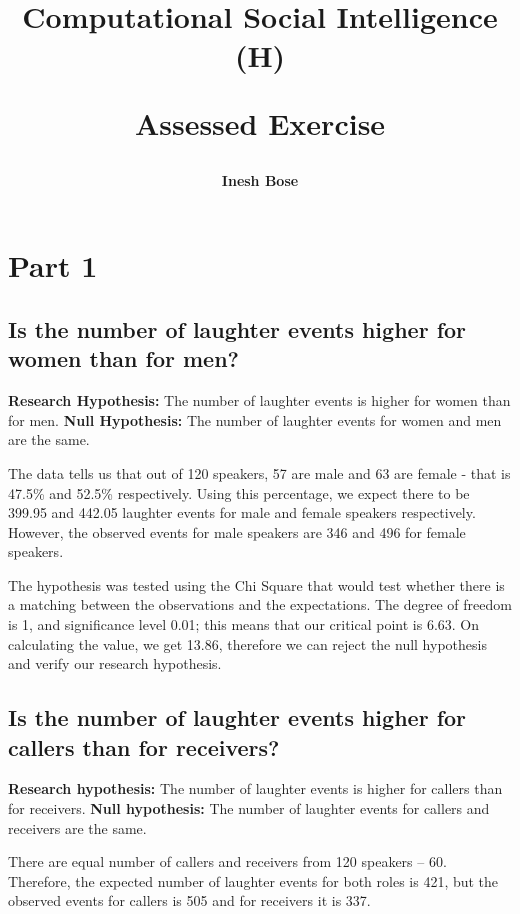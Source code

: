\documentclass[12pt,a4paper]{article}
\title{%
    {\Large Computational Social Intelligence (H) \par}
    {\Huge Assessed Exercise \par}
}
\author{\bf Inesh Bose}
\date{}
\begin{document}

\maketitle




\section*{Part 1}

\subsection*{Is the number of laughter events higher for women than for men?}

\textbf{Research Hypothesis:} The number of laughter events is higher for women than for men.\newline
\textbf{Null Hypothesis:} The number of laughter events for women and men are the same.

The data tells us that out of 120 speakers, 57 are male and 63 are female - that is 47.5\% and 52.5\% respectively. Using this percentage, we expect there to be 399.95 and 442.05 laughter events for male and female speakers respectively. However, the observed events for male speakers are 346 and 496 for female speakers.

The hypothesis was tested using the Chi Square that would test whether there is a matching between the observations and the expectations. The degree of freedom is 1, and significance level 0.01; this means that our critical point is 6.63. On calculating the value, we get 13.86, therefore we can reject the null hypothesis and verify our research hypothesis.

\subsection*{Is the number of laughter events higher for callers than for receivers?}

\textbf{Research hypothesis:} The number of laughter events is higher for callers than for receivers.\newline
\textbf{Null hypothesis:} The number of laughter events for callers and receivers are the same.

There are equal number of callers and receivers from 120 speakers -- 60. Therefore, the expected number of laughter events for both roles is 421, but the observed events for callers is 505 and for receivers it is 337.
\end{document}
